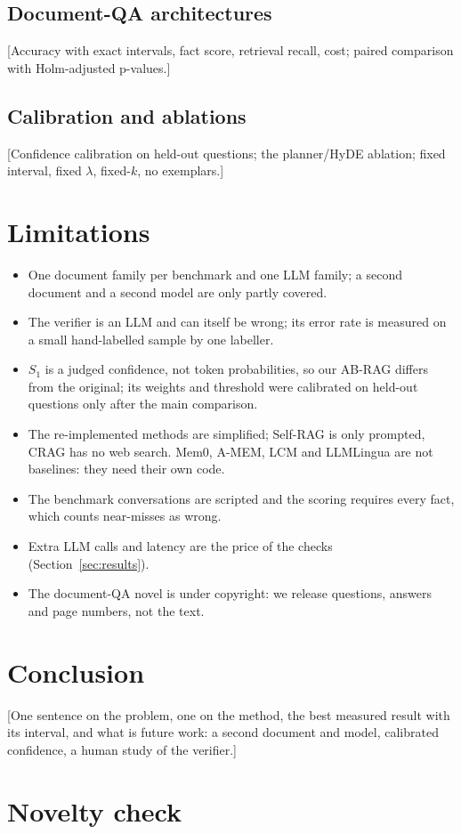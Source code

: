 \documentclass[10pt,twocolumn]{article}
\newcommand{\todo}[1]{{\color{red}[#1]}}      %
\begin{document}
\subsection{Document-QA architectures}
\todo{Accuracy with exact intervals, fact score, retrieval recall, cost; paired comparison with Holm-adjusted p-values.}

\subsection{Calibration and ablations}
\todo{Confidence calibration on held-out questions; the planner/HyDE ablation; fixed interval, fixed $\lambda$, fixed-$k$, no exemplars.}

\section{Limitations}\label{sec:limits}
\begin{itemize}
\item One document family per benchmark and one LLM family; a second document and a second model are only partly covered.
\item The verifier is an LLM and can itself be wrong; its error rate is measured on a small hand-labelled sample by one labeller.
\item $S_1$ is a judged confidence, not token probabilities, so our AB-RAG differs from the original; its weights and threshold were calibrated on held-out questions only after the main comparison.
\item The re-implemented methods are simplified; Self-RAG is only prompted, CRAG has no web search. Mem0, A-MEM, LCM and LLMLingua are not baselines: they need their own code.
\item The benchmark conversations are scripted and the scoring requires every fact, which counts near-misses as wrong.
\item Extra LLM calls and latency are the price of the checks (Section~\ref{sec:results}).
\item The document-QA novel is under copyright: we release questions, answers and page numbers, not the text.
\end{itemize}

\section{Conclusion}
\todo{One sentence on the problem, one on the method, the best measured result with its interval, and what is future work: a second document and model, calibrated confidence, a human study of the verifier.}




\appendix
\section{Novelty check}\label{app:novelty}
\end{document}
